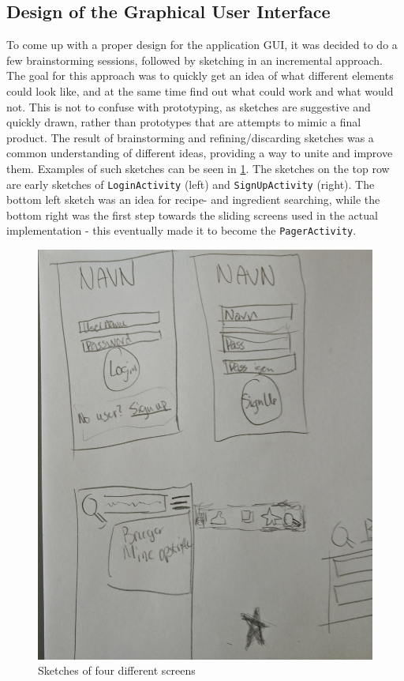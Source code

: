 \subsection{Design of the Graphical User Interface}
\label{subsec:designgui}

To come up with a proper design for the application GUI, it was decided to do a few brainstorming sessions, followed by sketching in an incremental approach. The goal for this approach was to quickly get an idea of what different elements could look like, and at the same time find out what could work and what would not. This is not to confuse with prototyping, as sketches are suggestive and quickly drawn, rather than prototypes that are attempts to mimic a final product.
The result of brainstorming and refining/discarding sketches was a common understanding of different ideas, providing a way to unite and improve them. Examples of such sketches can be seen in \ref{fig:prototype_brainstorming}. The sketches on the top row are early sketches of \texttt{LoginActivity} (left) and \texttt{SignUpActivity} (right). The bottom left sketch was an idea for recipe- and ingredient searching, while the bottom right was the first step towards the sliding screens used in the actual implementation - this eventually made it to become the \texttt{PagerActivity}.

\begin{figure}[H]
	\centering
	\includegraphics[width=\textwidth]{Pictures/prototype_brainstorming.jpg}
	\caption{Sketches of four different screens}
	\label{fig:prototype_brainstorming}
\end{figure}

